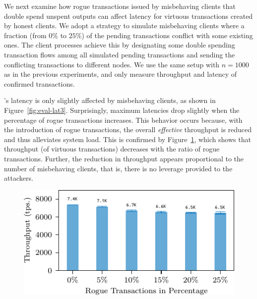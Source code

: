 We next examine how rogue transactions issued by misbehaving clients that
double spend unspent outputs can affect latency for virtuous
transactions created by honest clients. We adopt a strategy to
simulate misbehaving clients where a fraction (from $0\%$ to $25\%$) of the
pending transactions conflict with some existing ones.
The client processes
achieve this by designating some double spending transaction flows among all
simulated pending transactions and sending the conflicting transactions to
different nodes. We use the same setup with $n = 1000$ as in the previous
experiments, and only measure throughput and latency of confirmed transactions.

{\sysname}'s latency is only slightly affected by misbehaving clients, as shown
in Figure~\ref{fig:eval-lat3}. Surprisingly, maximum latencies drop slightly when
the percentage of rogue transactions increases.  This behavior occurs
because, with the introduction of rogue transactions, the overall
\emph{effective} throughput is reduced and thus alleviates system load.
This is confirmed by
Figure~\ref{fig:eval-thr2}, which shows that throughput (of virtuous transactions) decreases with the ratio of rogue transactions.
Further, the reduction in throughput appears proportional to the number of misbehaving clients,
that is, there is no leverage provided to the attackers.

\begin{figure}
\includegraphics[width=\linewidth]{figures/thr-byz.pdf}
\label{fig:eval-thr2}
\end{figure}

